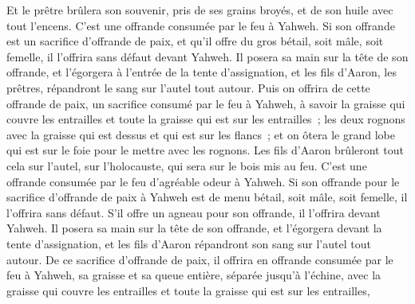 \begin{multicols}{2}
Et le prêtre brûlera son souvenir, pris de ses grains broyés, et de son huile avec tout l'encens. C'est une offrande consumée par le feu à Yahweh.
\VerseOne{}Si son offrande est un sacrifice d'offrande de paix, et qu'il offre du gros bétail, soit mâle, soit femelle, il l'offrira sans défaut devant Yahweh.
Il posera sa main sur la tête de son offrande, et l'égorgera à l'entrée de la tente d'assignation, et les fils d'Aaron, les prêtres, répandront le sang sur l'autel tout autour.
Puis on offrira de cette offrande de paix, un sacrifice consumé par le feu à Yahweh, à savoir la graisse qui couvre les entrailles et toute la graisse qui est sur les entrailles~;
les deux rognons avec la graisse qui est dessus et qui est sur les flancs~; et on ôtera le grand lobe qui est sur le foie pour le mettre avec les rognons.
Les fils d'Aaron brûleront tout cela sur l'autel, sur l'holocauste, qui sera sur le bois mis au feu. C'est une offrande consumée par le feu d'agréable odeur à Yahweh.
Si son offrande pour le sacrifice d'offrande de paix à Yahweh est de menu bétail, soit mâle, soit femelle, il l'offrira sans défaut.
S'il offre un agneau pour son offrande, il l'offrira devant Yahweh.
Il posera sa main sur la tête de son offrande, et l'égorgera devant la tente d'assignation, et les fils d'Aaron répandront son sang sur l'autel tout autour.
De ce sacrifice d'offrande de paix, il offrira en offrande consumée par le feu à Yahweh, sa graisse et sa queue entière, séparée jusqu'à l'échine, avec la graisse qui couvre les entrailles et toute la graisse qui est sur les entrailles,

\end{multicols}
